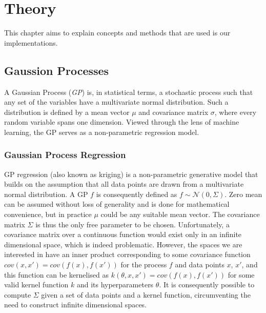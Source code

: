 \chapter{Theory}
\label{cha:theory}
This chapter aims to explain concepts and methods that are used is our implementations.

\section{Gaussion Processes}
A Gaussian Process (\textit{GP}) is, in statistical terms, a stochastic process such that any set of the variables have a multivariate normal distribution. Such a distribution is defined by a mean vector $\mu$ and covariance matrix $\sigma$, where every random variable spans one dimension. Viewed through the lens of machine learning, the GP serves as a non-parametric regression model. \cite{Bishop-2006} \cite{Rasmussen-Williams-2006}

\subsection{Gaussian Process Regression}
GP regression (also known as kriging) is a non-parametric generative model that builds on the assumption that all data points are drawn from a multivariate normal distribution. A GP $f$ is consequently defined as $f \sim \mathcal{N}(0, \Sigma)$. Zero mean can be assumed without loss of generality and is done for mathematical convenience, but in practice $\mu$ could be any suitable mean vector. The covariance matrix $\Sigma$ is thus the only free parameter to be chosen. Unfortunately, a covariance matrix over a continuous function would exist only in an infinite dimensional space, which is indeed problematic. However, the spaces we are interested in have an inner product corresponding to some covariance function $cov(x, x') = cov(f(x), f(x'))$ for the process $f$ and data points $x$, $x'$, and this function can be kernelised as $k(\theta, x, x') = cov(f(x), f(x'))$ for some valid kernel function $k$ and its hyperparameters $\theta$. It is consequently possible to compute $\Sigma$ given a set of data points and a kernel function, circumventing the need to construct infinite dimensional spaces. \cite{Bishop-2006} \cite{Rasmussen-Williams-2006}

